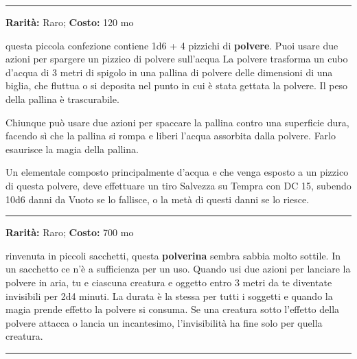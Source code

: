 \begin{multicols}{2}
\smallskip\noindent\rule{\linewidth}{2pt}  \hypertarget{Polveredell'Aridità}{}\smallskip{}\noindent\label{Polveredell'Aridità}

\textbf{Rarità:} Raro; \textbf{Costo:} 120 mo

questa piccola confezione contiene 1d6 + 4 pizzichi di \textbf{polvere}. Puoi usare due azioni per spargere un pizzico di polvere sull'acqua La polvere trasforma un cubo d'acqua di 3 metri di spigolo in una pallina di polvere delle dimensioni di una biglia, che fluttua o si deposita nel punto in cui è stata gettata la polvere. Il peso della pallina è trascurabile.

Chiunque può usare due azioni per spaccare la pallina contro una superficie dura, facendo sì che la pallina si rompa e liberi l'acqua assorbita dalla polvere. Farlo esaurisce la magia della pallina.

Un elementale composto principalmente d'acqua e che venga esposto a un pizzico di questa polvere, deve effettuare un tiro Salvezza su Tempra con DC 15, subendo 10d6 danni da Vuoto se lo fallisce, o la metà di questi danni se lo riesce.

\smallskip\noindent\rule{\linewidth}{2pt}  \hypertarget{PolveredellaSparizione}{}\smallskip{}\noindent\label{PolveredellaSparizione}

\textbf{Rarità:} Raro; \textbf{Costo:} 700 mo

rinvenuta in piccoli sacchetti, questa \textbf{polverina} sembra sabbia molto sottile. In un sacchetto ce n'è a sufficienza per un uso. Quando usi due azioni per lanciare la polvere in aria, tu e ciascuna creatura e oggetto entro 3 metri da te diventate invisibili per 2d4 minuti. La durata è la stessa per tutti i soggetti e quando la magia prende effetto la polvere si consuma. Se una creatura sotto l'effetto della polvere attacca o lancia un incantesimo, l'invisibilità ha fine solo per quella creatura.

\smallskip\noindent\rule{\linewidth}{2pt}  \hypertarget{PolveredelloStarnutoedelSoffocamento}{}\smallskip{}\noindent\label{PolveredelloStarnutoedelSoffocamento}


\end{multicols}

